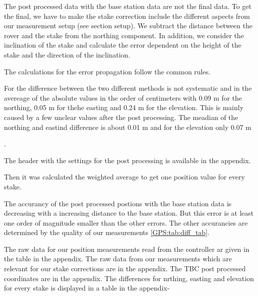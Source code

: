 The post processed data with the base station data are not the final data. 
To get the final, we have to make the stake correction include the different aspects from our measurement setup (see section setup).
We subtract the distance between the rover and the stake from the northing component.
In addition, we consider the inclination of the stake and calculate the error dependent on the height of the stake and the direction of the inclination.\medskip

The calculations for the error propagation follow the common rules.

For the difference between the two different methods is not systematic and in the avereage of the absolute values in the order of centimeters with 0.09 m for the northing, 0.05 m for thehe  easting and 0.24 m for the elevation. This is mainly caused by a few unclear values after the post processing. The meadian of the northing and eastind difference is about 0.01 m and for the elevation only 0.07 m 

\citep{Trprocess}.

The header with the settings for the post processing is available in the appendix.

Then it was calculated the weighted average to get one position value for every stake.

The accurancy of the post processed postions with the base station data is decreasing with a increasing distance to the base station. 
But this error is at least one order of magnitude smaller than the other errors. 
The other accurancies are determined by the quality of our measurements \ref{GPS:tab:diff_tab}.


The raw data for our position measurements read from the controller ar given in the table in the appendix. 
The raw data from our measurements which are relevant for our stake corrections are in the appendix.
The TBC post processed coordinates are in the appendix. 
The differences for nrthing, easting and elevation for every stake is displayed in a table in the appendix-



